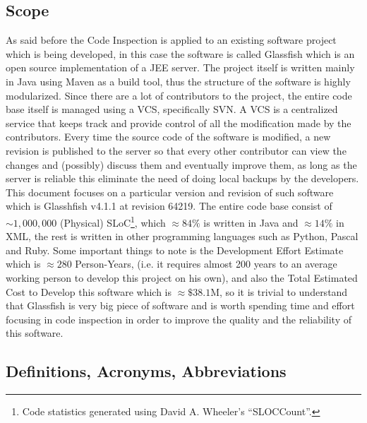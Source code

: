 \subsection{Scope}
As said before the Code Inspection is applied to an existing software project which is being developed, in this case the software is called Glassfish which is an open source implementation of a JEE server.
The project itself is written mainly in Java using Maven as a build tool, thus the structure of the software is highly modularized. \newline
Since there are a lot of contributors to the project, the entire code base itself is managed using a VCS, specifically SVN. A VCS is a centralized service that keeps track and provide control of all the modification made by the contributors. Every time the source code of the software is modified, a new revision is published to the server so that every other contributor can view the changes and (possibly) discuss them and eventually improve them, as long as the server is reliable this eliminate the need of doing local backups by the developers.\newline
This document focuses on a particular version and revision of such software which is Glasshfish v4.1.1 at revision 64219.
The entire code base consist of $\sim 1,000,000$ (Physical) SLoC\footnote{Code statistics generated using David A. Wheeler's ``SLOCCount''.}, which $\approx 84\%$ is written in Java and $\approx14\%$ in XML, the rest is written in other programming languages such as Python, Pascal and Ruby. Some important things to note is the Development Effort Estimate which is $\approx 280$ Person-Years, (i.e. it requires almost 200 years to an average working person to develop this project on his own), and also the Total Estimated Cost to Develop this software which is $\approx \$38.1$M, so it is trivial to understand that Glassfish is very big piece of software and is worth spending time and effort focusing in code inspection in order to improve the quality and the reliability of this software. 
\subsection{Definitions, Acronyms, Abbreviations}
